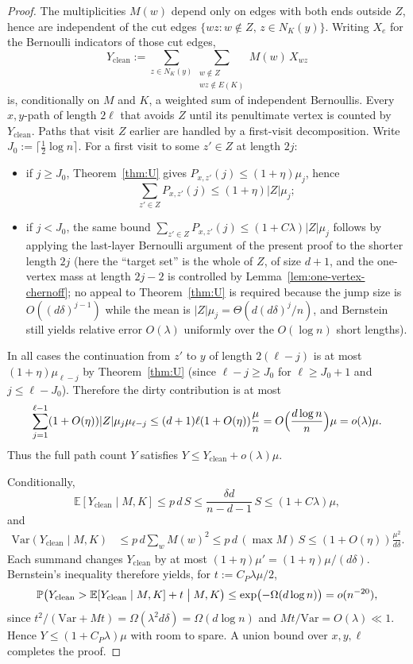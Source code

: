 \documentclass[11pt]{article}
\newcommand{\EE}{\mathbb{E}}
\newcommand{\PP}{\mathbb{P}}
\newcommand{\Var}{\mathrm{Var}}
\begin{document}
\begin{proof}
The multiplicities \(M(w)\) depend only on edges with both ends outside \(Z\),
hence are independent of the cut edges
\(\{wz:w\notin Z,\,z\in N_K(y)\}\).
Writing \(X_e\) for the Bernoulli indicators of those cut edges,
\[
Y_{\mathrm{clean}}
:=\sum_{z\in N_K(y)}\sum_{\substack{w\notin Z\\ wz\notin E(K)}}M(w)\,X_{wz}
\]
is, conditionally on \(M\) and \(K\), a weighted sum of independent Bernoullis.
Every \(x,y\)-path of length \(2\ell\) that avoids \(Z\) until its penultimate vertex
is counted by \(Y_{\mathrm{clean}}\).
Paths that visit \(Z\) earlier are handled by a first-visit decomposition.
Write \(J_0:=\lceil\tfrac12\log n\rceil\).
For a first visit to some \(z'\in Z\) at length \(2j\):
\begin{itemize}
\item if \(j\ge J_0\), Theorem~\ref{thm:U} gives
\(P_{x,z'}(j)\le(1+\eta)\mu_j\), hence
\[
\sum_{z'\in Z}P_{x,z'}(j)\le(1+\eta)|Z|\mu_j;
\]
\item if \(j<J_0\), the same bound
\(\sum_{z'\in Z}P_{x,z'}(j)\le(1+C\lambda)|Z|\mu_j\)
follows by applying the last-layer Bernoulli argument of the present proof
to the shorter length \(2j\) (here the ``target set'' is the whole of \(Z\),
of size \(d+1\), and the one-vertex mass at length \(2j-2\) is controlled by
Lemma~\ref{lem:one-vertex-chernoff}; no appeal to Theorem~\ref{thm:U} is
required because the jump size is \(O((d\delta)^{j-1})\) while the mean is
\(|Z|\mu_j=\Theta(d(d\delta)^j/n)\), and Bernstein still yields relative error
\(O(\lambda)\) uniformly over the \(O(\log n)\) short lengths).
\end{itemize}
In all cases the continuation from \(z'\) to \(y\) of length \(2(\ell-j)\) is at most
\((1+\eta)\mu_{\ell-j}\) by Theorem~\ref{thm:U} (since \(\ell-j\ge J_0\) for
\(\ell\ge J_0+1\) and \(j\le\ell-J_0\)).
Therefore the dirty contribution is at most
\[
\sum_{j=1}^{\ell-1}(1+O(\eta))|Z|\mu_j\mu_{\ell-j}
\le(d+1)\ell(1+O(\eta))\frac{\mu}{n}
=O\Bigl(\frac{d\log n}{n}\Bigr)\mu
=o(\lambda)\mu.
\]
Thus the full path count \(Y\) satisfies \(Y\le Y_{\mathrm{clean}}+o(\lambda)\mu\).

Conditionally,
\[
\EE[Y_{\mathrm{clean}}\mid M,K]
\le p\,d\,S
\le\frac{\delta d}{n-d-1}\,S
\le(1+C\lambda)\mu,
\]
and
\begin{align*}
\Var(Y_{\mathrm{clean}}\mid M,K)
&\le p\,d\sum_w M(w)^2
\le p\,d\,(\max M)\,S
\le(1+O(\eta))\frac{\mu^2}{d\delta}.
\end{align*}
Each summand changes \(Y_{\mathrm{clean}}\) by at most
\((1+\eta)\mu'=(1+\eta)\mu/(d\delta)\).
Bernstein's inequality therefore yields, for \(t:=C_P\lambda\mu/2\),
\[
\PP\bigl(Y_{\mathrm{clean}}>\EE[Y_{\mathrm{clean}}\mid M,K]+t\bigm|M,K\bigr)
\le\exp\bigl(-\Omega(d\log n)\bigr)=o(n^{-20}),
\]
since \(t^2/(\Var+Mt)=\Omega(\lambda^2 d\delta)=\Omega(d\log n)\) and
\(Mt/\Var=O(\lambda)\ll 1\).
Hence \(Y\le(1+C_P\lambda)\mu\) with room to spare.
A union bound over \(x,y,\ell\) completes the proof.
\end{proof}
\end{document}
